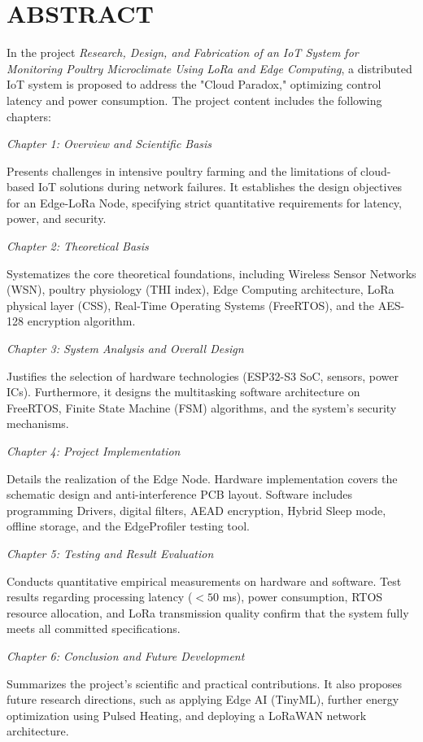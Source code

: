 \newpage

\section*{ABSTRACT}

In the project \textit{Research, Design, and Fabrication of an IoT System for Monitoring Poultry Microclimate Using LoRa and Edge Computing}, a distributed IoT system is proposed to address the "Cloud Paradox," optimizing control latency and power consumption. The project content includes the following chapters:

\textit{Chapter 1: Overview and Scientific Basis}

Presents challenges in intensive poultry farming and the limitations of cloud-based IoT solutions during network failures. It establishes the design objectives for an Edge-LoRa Node, specifying strict quantitative requirements for latency, power, and security.

\textit{Chapter 2: Theoretical Basis}

Systematizes the core theoretical foundations, including Wireless Sensor Networks (WSN), poultry physiology (THI index), Edge Computing architecture, LoRa physical layer (CSS), Real-Time Operating Systems (FreeRTOS), and the AES-128 encryption algorithm.

\textit{Chapter 3: System Analysis and Overall Design}

Justifies the selection of hardware technologies (ESP32-S3 SoC, sensors, power ICs). Furthermore, it designs the multitasking software architecture on FreeRTOS, Finite State Machine (FSM) algorithms, and the system's security mechanisms.

\textit{Chapter 4: Project Implementation}

Details the realization of the Edge Node. Hardware implementation covers the schematic design and anti-interference PCB layout. Software includes programming Drivers, digital filters, AEAD encryption, Hybrid Sleep mode, offline storage, and the EdgeProfiler testing tool.

\textit{Chapter 5: Testing and Result Evaluation}

Conducts quantitative empirical measurements on hardware and software. Test results regarding processing latency ($<50$ ms), power consumption, RTOS resource allocation, and LoRa transmission quality confirm that the system fully meets all committed specifications.

\textit{Chapter 6: Conclusion and Future Development}

Summarizes the project's scientific and practical contributions. It also proposes future research directions, such as applying Edge AI (TinyML), further energy optimization using Pulsed Heating, and deploying a LoRaWAN network architecture.

\cleardoublepage